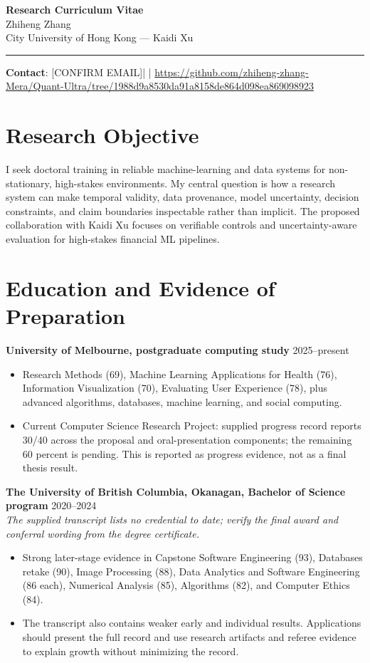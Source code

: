 \documentclass[11pt]{article}
\newcommand{\ApplicantName}{Zhiheng Zhang}
\newcommand{\ApplicantEmail}{[CONFIRM EMAIL]}
\newcommand{\ApplicantPhone}{[CONFIRM PHONE]}
\newcommand{\ApplicantGitHub}{\url{https://github.com/zhiheng-zhang-Mera/Quant-Ultra/tree/1988d9a8530da91a8158de864d098ea869098923}}
\begin{document}
\begin{center}
{\LARGE\bfseries Research Curriculum Vitae}\\[0.25em]
{\large \ApplicantName}\\
City University of Hong Kong --- Kaidi Xu
\end{center}
\vspace{0.35em}\hrule\vspace{0.65em}

\textbf{Contact}: \ApplicantEmail\quad | \quad \ApplicantPhone\quad | \quad \ApplicantGitHub

\section*{Research Objective}
I seek doctoral training in reliable machine-learning and data systems for non-stationary, high-stakes environments. My central question is how a research system can make temporal validity, data provenance, model uncertainty, decision constraints, and claim boundaries inspectable rather than implicit. The proposed collaboration with Kaidi Xu focuses on verifiable controls and uncertainty-aware evaluation for high-stakes financial ML pipelines.

\section*{Education and Evidence of Preparation}
\textbf{University of Melbourne, postgraduate computing study} \hfill 2025--present
\begin{itemize}
\item Research Methods (69), Machine Learning Applications for Health (76), Information Visualization (70), Evaluating User Experience (78), plus advanced algorithms, databases, machine learning, and social computing.
\item Current Computer Science Research Project: supplied progress record reports 30/40 across the proposal and oral-presentation components; the remaining 60 percent is pending. This is reported as progress evidence, not as a final thesis result.
\end{itemize}

\textbf{The University of British Columbia, Okanagan, Bachelor of Science program} \hfill 2020--2024\\
\textit{The supplied transcript lists no credential to date; verify the final award and conferral wording from the degree certificate.}
\begin{itemize}
\item Strong later-stage evidence in Capstone Software Engineering (93), Databases retake (90), Image Processing (88), Data Analytics and Software Engineering (86 each), Numerical Analysis (85), Algorithms (82), and Computer Ethics (84).
\item The transcript also contains weaker early and individual results. Applications should present the full record and use research artifacts and referee evidence to explain growth without minimizing the record.
\end{itemize}
\end{document}
